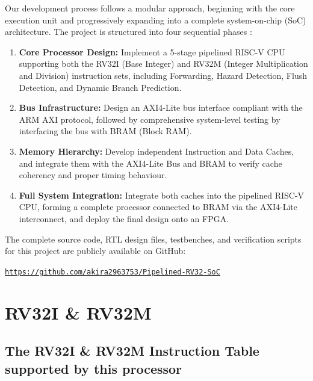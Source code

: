 \documentclass[12pt,a4paper]{report}
\begin{document}
Our development process follows a modular approach, beginning with the core execution unit and progressively expanding into a complete system-on-chip (SoC) architecture. The project is structured into four sequential phases :

\begin{enumerate}
    \item \textbf{Core Processor Design:} Implement a 5-stage pipelined RISC-V CPU supporting both the RV32I (Base Integer) and RV32M (Integer Multiplication and Division) instruction sets, including Forwarding, Hazard Detection, Flush Detection, and Dynamic Branch Prediction.

    \item \textbf{Bus Infrastructure:} Design an AXI4-Lite bus interface compliant with the ARM AXI protocol, followed by comprehensive system-level testing by interfacing the bus with BRAM (Block RAM).

    \item \textbf{Memory Hierarchy:} Develop independent Instruction and Data Caches, and integrate them with the AXI4-Lite Bus and BRAM to verify cache coherency and proper timing behaviour.

    \item \textbf{Full System Integration:} Integrate both caches into the pipelined RISC-V CPU, forming a complete processor connected to BRAM via the AXI4-Lite interconnect, and deploy the final design onto an FPGA.
\end{enumerate}

\medskip
\noindent The complete source code, RTL design files, testbenches, and verification scripts for this project are publicly available on GitHub:

\medskip
\noindent\href{https://github.com/akira2963753/Pipelined-RV32-SoC}{\texttt{https://github.com/akira2963753/Pipelined-RV32-SoC}}


\chapter{RV32I \& RV32M}
\newpage
\section{The RV32I \& RV32M Instruction Table supported by this processor}
\end{document}
